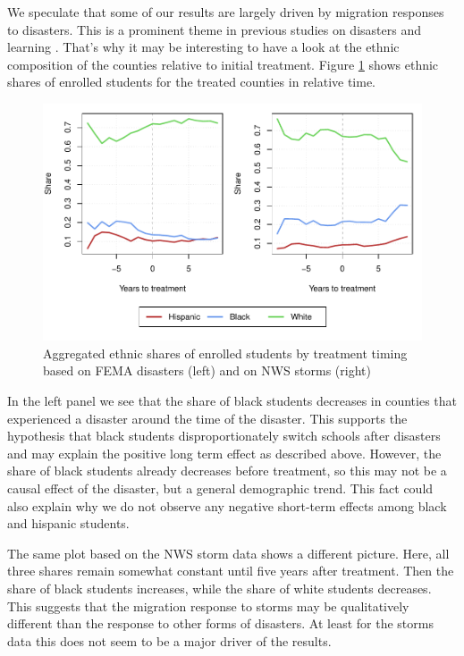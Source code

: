 We speculate that some of our results are largely driven by migration responses to disasters. This is a prominent theme in previous studies on disasters and learning \citep{Pane_2008, Sacerdote_2012}. That's why it may be interesting to have a look at the ethnic composition of the counties relative to initial treatment. Figure \ref{EthnicComposition} shows ethnic shares of enrolled students for the treated counties in relative time.

\begin{figure}[!h]
	\centering
	\includegraphics[scale=1]{"../Code & Data/EthnicComposition.pdf"}
	\caption{Aggregated ethnic shares of enrolled students by treatment timing based on FEMA disasters (left) and on NWS storms (right)}
	\label{EthnicComposition}
\end{figure}

In the left panel we see that the share of black students decreases in counties that experienced a disaster around the time of the disaster. This supports the hypothesis that black students disproportionately switch schools after disasters and may explain the positive long term effect as described above. However, the share of black students already decreases before treatment, so this may not be a causal effect of the disaster, but a general demographic trend. This fact could also explain why we do not observe any negative short-term effects among black and hispanic students.

The same plot based on the NWS storm data shows a different picture. Here, all three shares remain somewhat constant until five years after treatment. Then the share of black students increases, while the share of white students decreases. This suggests that the migration response to storms may be qualitatively different than the response to other forms of disasters. At least for the storms data this does not seem to be a major driver of the results.

